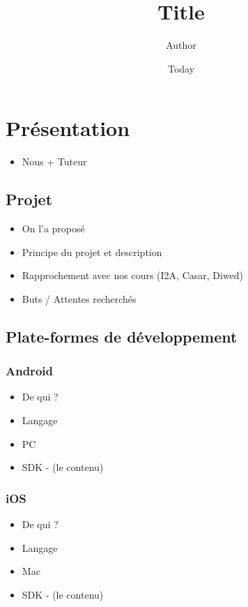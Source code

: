 \documentclass[]{report}
\begin{document}
\title{Title}
\author{Author}
\date{Today}
\maketitle

\chapter{Présentation}
	\begin{itemize}
		\item{Nous + Tuteur}
	\end{itemize}
	
	\section{Projet}
		\begin{itemize}
			\item{On l'a proposé}
			\item{Principe du projet et description}
			\item{Rapprochement avec nos cours (I2A, Casar, Diwed)}
			\item{Buts / Attentes recherchés}
		\end{itemize}
		
	\section{Plate-formes de développement}
		\subsection{Android}
			\begin{itemize}
				\item{De qui ?}
				\item{Langage}
				\item{PC}
				\item{SDK - (le contenu)}
			\end{itemize}
		\subsection{iOS}
			\begin{itemize}
				\item{De qui ?}
				\item{Langage}
				\item{Mac}
				\item{SDK - (le contenu)}
			\end{itemize}
			
\end{document}
